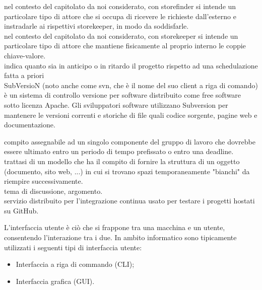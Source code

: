 \documentclass{scalatekids-article}
\begin{document}
 nel contesto del capitolato da noi considerato, con storefinder si intende un particolare tipo di attore che si occupa di ricevere le richieste dall’esterno e instradarle ai rispettivi storekeeper, in modo da soddisfarle.
\\

   nel contesto del capitolato da noi considerato, con storekeeper si intende un particolare tipo di attore che mantiene fisicamente al proprio interno le coppie chiave-valore.
  \\
  
   indica quanto sia in anticipo o in ritardo il progetto rispetto ad una schedulazione fatta a priori
  \\

   SubVersioN (noto anche come svn, che è il nome del suo client a riga di comando) è un sistema di controllo versione per software distribuito come free software sotto licenza Apache.
  Gli sviluppatori software utilizzano Subversion per mantenere le versioni correnti e storiche di file quali codice sorgente, pagine web e documentazione.
  \\


   compito assegnabile ad un singolo componente del gruppo di lavoro che dovrebbe essere ultimato entro un periodo di tempo prefissato o entro una deadline.
  \\

   trattasi di un modello che ha il compito di fornire la struttura di un oggetto (documento, sito web, ...) in cui si trovano spazi temporaneamente "bianchi" da riempire successivamente.
  \\

   tema di discussione, argomento.
  \\

   servizio distribuito per l'integrazione continua usato per testare i progetti hostati su GitHub.
  \\


   L'interfaccia utente è ciò che si frappone tra una macchina e un utente, consentendo l'interazione tra i due. In ambito informatico sono tipicamente utilizzati i seguenti tipi di interfaccia utente:

  \begin{itemize}
  \item Interfaccia a riga di commando (CLI);
  \item Interfaccia grafica (GUI).
  \end{itemize}
\end{document}
